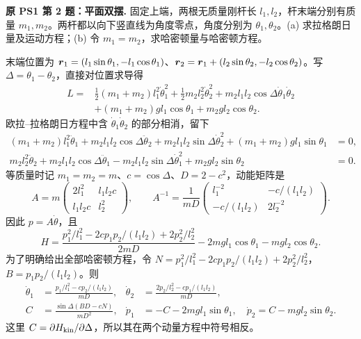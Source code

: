 \begin{example}
\textbf{原 PS1 第 2 题：平面双摆.} 
固定上端，两根无质量刚杆长 $l_1,l_2$，杆末端分别有质量 $m_1,m_2$。两杆都以向下竖直线为角度零点，角度分别为 $\theta_1,\theta_2$。(a) 求拉格朗日量及运动方程；(b) 令 $m_1=m_2$，求哈密顿量与哈密顿方程。
\end{example}
\begin{solution}
末端位置为 $\boldsymbol{r}_1=(l_1\sin\theta_1,-l_1\cos\theta_1)$、$\boldsymbol{r}_2=\boldsymbol{r}_1+(l_2\sin\theta_2,-l_2\cos\theta_2)$。写 $\Delta=\theta_1-\theta_2$，直接对位置求导得
\begin{align*}
 L={}&\frac12(m_1+m_2)l_1^2\dot\theta_1^2+\frac12m_2l_2^2\dot\theta_2^2
 +m_2l_1l_2\cos\Delta\dot\theta_1\dot\theta_2\\
 &+(m_1+m_2)gl_1\cos\theta_1+m_2gl_2\cos\theta_2.
\end{align*}
欧拉--拉格朗日方程中含 $\dot\theta_1\dot\theta_2$ 的部分相消，留下
\begin{align*}
 (m_1+m_2)l_1^2\ddot\theta_1+m_2l_1l_2\cos\Delta\ddot\theta_2
 +m_2l_1l_2\sin\Delta\dot\theta_2^2+(m_1+m_2)gl_1\sin\theta_1&=0,\\
 m_2l_2^2\ddot\theta_2+m_2l_1l_2\cos\Delta\ddot\theta_1
 -m_2l_1l_2\sin\Delta\dot\theta_1^2+m_2gl_2\sin\theta_2&=0.
\end{align*}
等质量时记 $m_1=m_2=m$、$c=\cos\Delta$、$D=2-c^2$，动能矩阵是
\[
 A=m\begin{pmatrix}2l_1^2&l_1l_2c\\l_1l_2c&l_2^2\end{pmatrix},\qquad
 A^{-1}=\frac1{mD}\begin{pmatrix}l_1^{-2}&-c/(l_1l_2)\\-c/(l_1l_2)&2l_2^{-2}\end{pmatrix}.
\]
因此 $p=A\dot\theta$，且
\[
 H=\frac{p_1^2/l_1^2-2cp_1p_2/(l_1l_2)+2p_2^2/l_2^2}{2mD}
 -2mgl_1\cos\theta_1-mgl_2\cos\theta_2.
\]
为了明确给出全部哈密顿方程，令 $N=p_1^2/l_1^2-2cp_1p_2/(l_1l_2)+2p_2^2/l_2^2$，$B=p_1p_2/(l_1l_2)$。则
\begin{align*}
 \dot\theta_1&=\frac{p_1/l_1^2-cp_2/(l_1l_2)}{mD},&
 \dot\theta_2&=\frac{2p_2/l_2^2-cp_1/(l_1l_2)}{mD},\\
 C&=\frac{\sin\Delta(BD-cN)}{mD^2},&
 \dot p_1&=-C-2mgl_1\sin\theta_1,\quad
 \dot p_2=C-mgl_2\sin\theta_2.
\end{align*}
这里 $C=\partial H_{\rm kin}/\partial\Delta$，所以其在两个动量方程中符号相反。
\end{solution}

